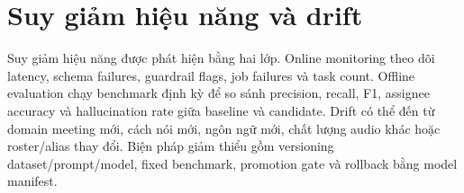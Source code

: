 \section{Suy giảm hiệu năng và drift}

Suy giảm hiệu năng được phát hiện bằng hai lớp. Online monitoring theo dõi latency, schema failures, guardrail flags, job failures và task count. Offline evaluation chạy benchmark định kỳ để so sánh precision, recall, F1, assignee accuracy và hallucination rate giữa baseline và candidate. Drift có thể đến từ domain meeting mới, cách nói mới, ngôn ngữ mới, chất lượng audio khác hoặc roster/alias thay đổi. Biện pháp giảm thiểu gồm versioning dataset/prompt/model, fixed benchmark, promotion gate và rollback bằng model manifest.
